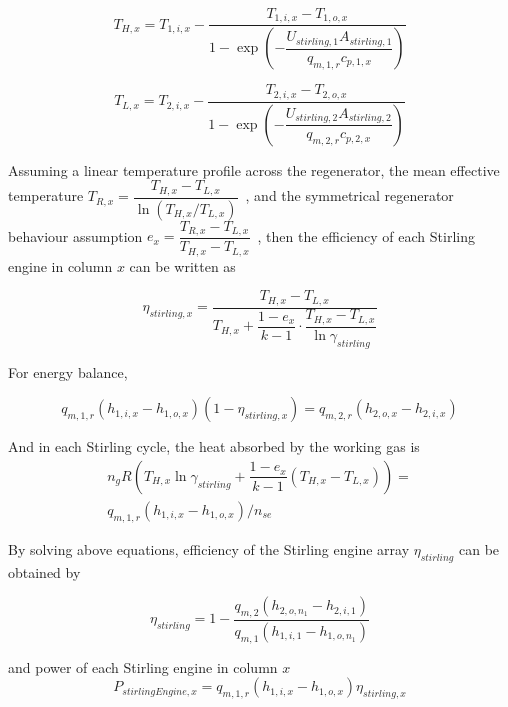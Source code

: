 \documentclass{article}
\begin{document}
\begin{equation*}
	T_{H,x}=T_{1,i,x}-\dfrac{T_{1,i,x}-T_{1,o,x}}{1-\exp(-\dfrac{U_{stirling,1}A_{stirling,1}}{q_{m,1,r}c_{p,1,x}})}\label{eq:T_H_x}
\end{equation*}


\begin{equation*}
	T_{L,x}=T_{2,i,x}-\dfrac{T_{2,i,x}-T_{2,o,x}}{1-\exp(-\dfrac{U_{stirling,2}A_{stirling,2}}{q_{m,2,r}c_{p,2,x}})}\label{eq:T_L_x}
\end{equation*}

Assuming a linear temperature profile across the regenerator, the mean effective temperature $T_{R,x}=\dfrac{T_{H,x}-T_{L,x}}{\ln(T_{H,x}/T_{L,x})}$~\cite{Der2007,Cavazzuti2012}, and the symmetrical regenerator behaviour assumption $e_{x}=\dfrac{T_{R,x}-T_{L,x}}{T_{H,x}-T_{L,x}}$~\cite{Formosa2010,Juhasz2010}, then the efficiency of each Stirling engine in column $x$ can be written as~\cite{Stine1985,Goswami2015}

\begin{equation*}
	\eta_{stirling,x}=\dfrac{T_{H,x}-T_{L,x}}{T_{H,x}+\dfrac{1-e_{x}}{k-1}\cdot\dfrac{T_{H,x}-T_{L,x}}{\ln\gamma_{stirling}}}\label{eq:eta_striling_x}
\end{equation*}

For energy balance,

\begin{equation*}
	q_{m,1,r}(h_{1,i,x}-h_{1,o,x})(1-\eta_{stirling,x})=q_{m,2,r}(h_{2,o,x}-h_{2,i,x})
\end{equation*}

And in each Stirling cycle, the heat absorbed by the working gas is 
\begin{equation*}
\begin{split}
	n_gR\left(T_{H,x}\ln\gamma_{stirling}+\dfrac{1-e_{x}}{k-1}\left(T_{H,x}-T_{L,x}\right)\right)=\\q_{m,1,r}(h_{1,i,x}-h_{1,o,x})/n_{se}
\end{split}
\end{equation*}

By solving above equations, efficiency of the Stirling engine array $\eta_{stirling}$ can be obtained by

\begin{equation*}
	\eta_{stirling}=1-\dfrac{q_{m,2}(h_{2,o,n_{1}}-h_{2,i,1})}{q_{m,1}(h_{1,i,1}-h_{1,o,n_{1}})}\label{eq:eta_stirling-1}
\end{equation*}


and power of each Stirling engine in column $x$
\begin{equation*}
	P_{stirlingEngine,x}=q_{m,1,r}(h_{1,i,x}-h_{1,o,x})\eta_{stirling,x}
\end{equation*}
\end{document}
